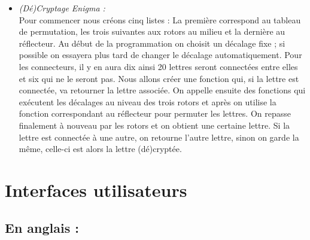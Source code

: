 \documentclass[a4paper,12pt,abstracton,titlepage]{scrartcl}
\begin{document}
\begin{itemize}
\item \textit{(Dé)Cryptage Enigma :}\\
Pour commencer nous créons cinq listes : La première correspond au tableau de permutation, les trois suivantes aux rotors au milieu et la dernière au réflecteur. Au début de la programmation on choisit un décalage fixe ; si possible on essayera plus tard de changer le décalage automatiquement.
Pour les connecteurs, il y en aura dix ainsi 20 lettres seront connectées entre elles et six qui ne le seront pas. Nous allons créer une fonction qui, si la lettre est connectée, va retourner la lettre associée.
On appelle ensuite des fonctions qui exécutent les décalages au niveau des trois rotors et après on utilise la fonction correspondant au réflecteur pour permuter les lettres. On repasse finalement à nouveau par les rotors et on obtient une certaine lettre. Si la lettre est connectée à une autre, on retourne l’autre lettre, sinon on garde la même, celle-ci est alors la lettre (dé)cryptée.\\
\end{itemize}

\newpage
\section{Interfaces utilisateurs}

{
}

\subsection{En anglais :}
\end{document}

